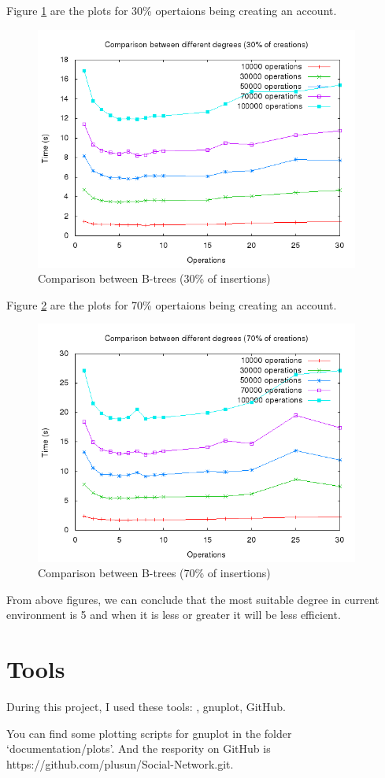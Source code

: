 \documentclass[a4paper, 11pt]{article}
\begin{document}
Figure \ref{cmpLOT30} are the plots for 30\% opertaions being creating an account.
\begin{figure}[htbp]
  \centering
  \includegraphics[width=0.95\textwidth]{./plots/cmpLOT30.png}
  \caption{Comparison between B-trees (30\% of insertions)}
  \label{cmpLOT30}
\end{figure}

Figure \ref{cmpLOT70} are the plots for 70\% opertaions being creating an account.
\begin{figure}[htbp]
  \centering
  \includegraphics[width=0.95\textwidth]{./plots/cmpLOT70.png}
  \caption{Comparison between B-trees (70\% of insertions)}
  \label{cmpLOT70}
\end{figure}

From above figures, we can conclude that the most suitable degree in current environment is 5 and when it is less or greater it will be less efficient.

\newpage
\appendix
\section{Tools}
During this project, I used these tools: \LaTeXe{}, gnuplot, GitHub.

You can find some plotting scripts for gnuplot in the folder `documentation/plots'. And the respority on GitHub is https://github.com/plusun/Social-Network.git.
\end{document}
